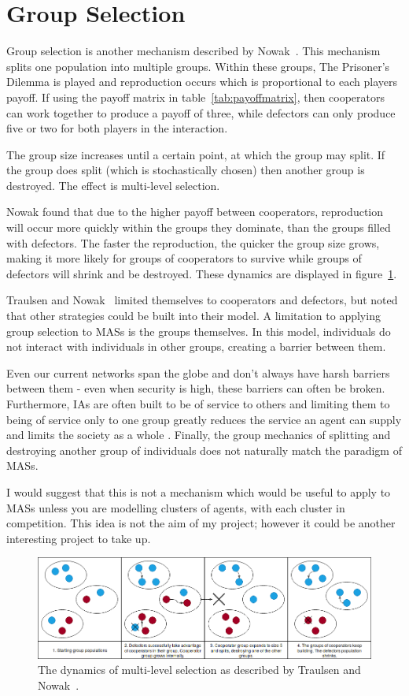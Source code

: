 \documentclass[]{final_report}
\begin{document}
\section{Group Selection}
Group selection is another mechanism described by Nowak~\cite{five_rules_coop}. This mechanism splits one population into multiple groups. Within these groups, The Prisoner's Dilemma is played and reproduction occurs which is proportional to each players payoff. If using the payoff matrix in table~\ref{tab:payoffmatrix}, then cooperators can work together to produce a payoff of three, while defectors can only produce five or two for both players in the interaction.\par
The group size increases until a certain point, at which the group may split. If the group does split (which is stochastically chosen) then another group is destroyed. The effect is multi-level selection.\par
Nowak found that due to the higher payoff between cooperators, reproduction will occur more quickly within the groups they dominate, than the groups filled with defectors. The faster the reproduction, the quicker the group size grows, making it more likely for groups of cooperators to survive while groups of defectors will shrink and be destroyed. These dynamics are displayed in figure~\ref{fig:group}.\par
Traulsen and Nowak~\cite{multilevel_nowak} limited themselves to cooperators and defectors, but noted that other strategies could be built into their model. A limitation to applying group selection to MASs is the groups themselves. In this model, individuals do not interact with individuals in other groups, creating a barrier between them.\par
Even our current networks span the globe and don't always have harsh barriers between them - even when security is high, these barriers can often be broken. Furthermore, IAs are often built to be of service to others and limiting them to being of service only to one group greatly reduces the service an agent can supply and limits the society as a whole . Finally, the group mechanics of splitting and destroying another group of individuals does not naturally match the paradigm of MASs.\par
I would suggest that this is not a mechanism which would be useful to apply to MASs unless you are modelling clusters of agents, with each cluster in competition. This idea is not the aim of my project; however it could be another interesting project to take up.
\begin{figure}
	\center
	\includegraphics[width=\textwidth]{GroupSelection.png}
	\caption{The dynamics of multi-level selection as described by Traulsen and Nowak~\cite{multilevel_nowak}.}
	\label{fig:group}
\end{figure}
\end{document}
